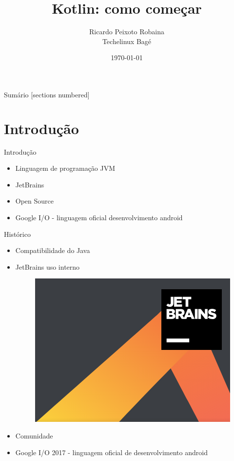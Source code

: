 \documentclass{beamer}
\title{Kotlin: como começar}
\date{\today}
\author{Ricardo Peixoto Robaina \\ Techelinux Bagé}
\institute{Universidade Federal do Pampa}
\begin{document}
	
	\begin{frame}[noframenumbering]
		\titlepage
		\thispagestyle{empty}
	\end{frame}
	
	\begin{frame}{Sumário}
		[sections numbered]
		\tableofcontents[hideallsubsections]
	\end{frame}

\section{Introdução}
	\begin{frame}{Introdução}
		
		\begin{itemize}
			\item Linguagem de programação JVM
			\item JetBrains
			\item Open Source
			\item Google I/O - linguagem oficial desenvolvimento android
		\end{itemize}
	
	\end{frame}

	\begin{frame}{Histórico}
		\begin{itemize}
			\item Compatibilidade do Java
			\item JetBrains uso interno
			\begin{figure}[!htb]
				\centering
				\includegraphics[scale=.20]{jetBrains.png}
			\end{figure}
			\item Comunidade
			\item Google I/O 2017 - linguagem oficial de desenvolvimento android
		\end{itemize}
	
	\end{frame}
\end{document}
